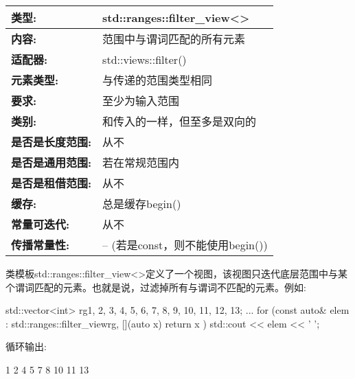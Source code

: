 \begin{longtable}[c]{|l|l|}
\hline
\textbf{类型:}                 & std::ranges::filter\_view\textless{}\textgreater{} \\ \hline
\endfirsthead
%
\endhead
%
\textbf{内容:}              & 范围中与谓词匹配的所有元素     \\ \hline
\textbf{适配器:}              & std::views::filter()                               \\ \hline
\textbf{元素类型:}         & 与传递的范围类型相同                          \\ \hline
\textbf{要求:}             & 至少为输入范围                               \\ \hline
\textbf{类别:}             & 和传入的一样，但至多是双向的           \\ \hline
\textbf{是否是长度范围:}       & 从不                                              \\ \hline
\textbf{是否是通用范围:}      & 若在常规范围内                                 \\ \hline
\textbf{是否是租借范围:}    & 从不                                              \\ \hline
\textbf{缓存:}               & 总是缓存begin()                              \\ \hline
\textbf{常量可迭代:}       & 从不                                              \\ \hline
\textbf{传播常量性:} & -- (若是const，则不能使用begin())                  \\ \hline
\end{longtable}

类模板std::ranges::filter\_view<>定义了一个视图，该视图只迭代底层范围中与某个谓词匹配的元素。也就是说，过滤掉所有与谓词不匹配的元素。例如:

\begin{cpp}
std::vector<int> rg{1, 2, 3, 4, 5, 6, 7, 8, 9, 10, 11, 12, 13};
...
for (const auto& elem : std::ranges::filter_view{rg, [](auto x) {
							return x %
					}}) {
	std::cout << elem << ' ';
}
\end{cpp}

循环输出:

\begin{shell}
1 2 4 5 7 8 10 11 13
\end{shell}

